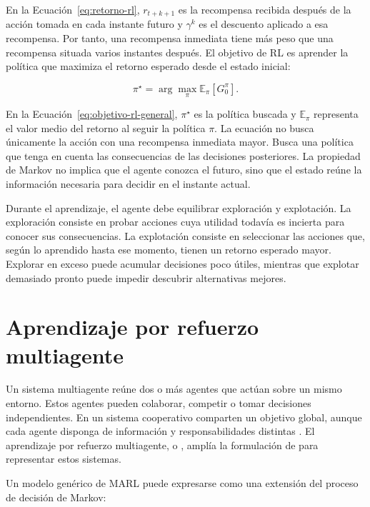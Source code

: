 En la Ecuación~\ref{eq:retorno-rl}, $r_{t+k+1}$ es la recompensa recibida después de la acción tomada en cada instante futuro y $\gamma^k$ es el descuento aplicado a esa recompensa. Por tanto, una recompensa inmediata tiene más peso que una recompensa situada varios instantes después. El objetivo de RL es aprender la política que maximiza el retorno esperado desde el estado inicial:

\begin{equation}
\pi^\star=\arg\max_{\pi}\mathbb{E}_{\pi}\left[G_0^{\pi}\right].
\label{eq:objetivo-rl-general}
\end{equation}

En la Ecuación~\ref{eq:objetivo-rl-general}, $\pi^\star$ es la política buscada y $\mathbb{E}_{\pi}$ representa el valor medio del retorno al seguir la política $\pi$. La ecuación no busca únicamente la acción con una recompensa inmediata mayor. Busca una política que tenga en cuenta las consecuencias de las decisiones posteriores. La propiedad de Markov no implica que el agente conozca el futuro, sino que el estado reúne la información necesaria para decidir en el instante actual.

Durante el aprendizaje, el agente debe equilibrar exploración y explotación. La exploración consiste en probar acciones cuya utilidad todavía es incierta para conocer sus consecuencias. La explotación consiste en seleccionar las acciones que, según lo aprendido hasta ese momento, tienen un retorno esperado mayor. Explorar en exceso puede acumular decisiones poco útiles, mientras que explotar demasiado pronto puede impedir descubrir alternativas mejores.

\section{Aprendizaje por refuerzo multiagente}
\label{sec:estado-arte-marl}

Un sistema multiagente reúne dos o más agentes que actúan sobre un mismo entorno. Estos agentes pueden colaborar, competir o tomar decisiones independientes. En un sistema cooperativo comparten un objetivo global, aunque cada agente disponga de información y responsabilidades distintas \cite{wooldridge2009multiagent,busoniu2008comprehensive}. El aprendizaje por refuerzo multiagente, o , amplía la formulación de  para representar estos sistemas.

Un modelo genérico de MARL puede expresarse como una extensión del proceso de decisión de Markov:

